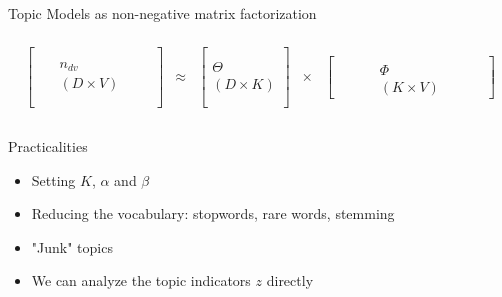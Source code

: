 \documentclass[10pt]{beamer}
\begin{document}
\begin{frame}{Topic Models as non-negative matrix factorization}
\begin{centering}
\[
\begin{array}{ccccc}
\\
\left[\begin{array}{ccc}
 & \text{ }\\
\\
\text{ } & n_{dv} & \text{ }\\
 & (D\times V)\text{ }\\
\\
\end{array}\right] & \approx & \left[\begin{array}{c}
\\
\\
\Theta\\
(D\times K)\\
\\
\end{array}\right] & \times & \left[\begin{array}{ccccc}
 &  & \text{ }\\
\text{ } & \text{ } & \Phi & \text{ } & \text{ }\\
 &  & (K\times V)
\end{array}\right]\\
\\
\end{array}
\]
\end{centering}

\end{frame}

\begin{frame}{Practicalities}

\begin{itemize}
    \item Setting $K$, $\alpha$ and $\beta$ \pause
    \item {\color{uured} Reducing the vocabulary}: stopwords, rare words, stemming \pause
    \item "Junk" topics\pause
    \item We can analyze the topic indicators $z$ directly
\end{itemize}
\end{frame}
\end{document}
